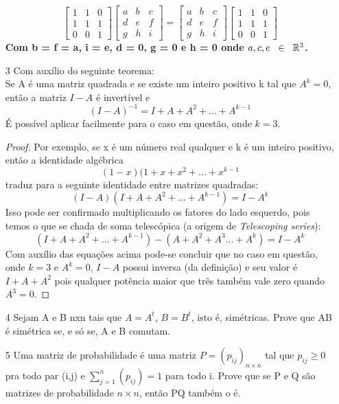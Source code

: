 \documentclass[11pt]{article}
\begin{document}
\begin{itemize}
$$
\begin{bmatrix}
1&1&0\\1&1&1\\0&0&1
\end{bmatrix}
\begin{bmatrix}
a&b&c\\d&e&f\\g&h&i
\end{bmatrix}
=
\begin{bmatrix}
a&b&c\\d&e&f\\g&h&i
\end{bmatrix}
\begin{bmatrix}
1&1&0\\1&1&1\\0&0&1
\end{bmatrix}
$$
\textbf{Com b = f = a, i = e, d = 0, g = 0 e h = 0 onde $a,c,e\hspace{2mm}\in\hspace{2mm}\mathbb{R}^3$.}

\item[3] Com auxílio do seguinte teorema:
\\ Se A é uma matriz quadrada e se existe um inteiro positivo k tal que $A^k=0$, então a matriz $I-A$ é invertível e $$(I-A)^{-1} = I + A + A^2 + ... + A^{k-1}$$
É possível aplicar facilmente para o caso em questão, onde $k=3$.
\begin{proof}
Por exemplo, se x é um número real qualquer e k é um inteiro positivo, então a identidade algébrica $$(1-x)(1+x+x^2+...+x^{k-1}$$ traduz para a seguinte identidade entre matrizes quadradas:
$$
(I-A)(I+A+A^2+...+A^{k-1})=I-A^k
$$
Isso pode ser confirmado multiplicando os fatores do lado esquerdo, pois temos o que se chada de soma telescópica (a origem de \textit{Telescoping series}):
$$
(I+A+A^2+...+A^{k-1}) - (A+A^2+A^3...+A^k) = I-A^k
$$
Com auxílio das equações acima pode-se concluir que no caso em questão, onde $k=3$ e $A^k=0$,      $I-A$ possui inversa (da definição) e seu valor é $I + A + A^2$ pois qualquer potência maior que três também vale zero quando $A^3=0$.\qedhere
\end{proof}


\item[4] Sejam A e B nxn tais que $A=A^t$, $B=B^t$, isto é, simétricas. Prove que AB é simétrica se, e só se, A e B comutam.

\item[5] Uma matriz de probabilidade é uma matriz $P=(p_{ij})_{n \times n}$ tal que $p_{ij}\geq0$ pra todo par (i,j) e $\sum_{j=1}^{n}(p_{ij})=1$ para todo i. Prove que se P e Q são matrizes de probabilidade $n \times n$, então PQ também o é.


\end{itemize}
\end{document}
